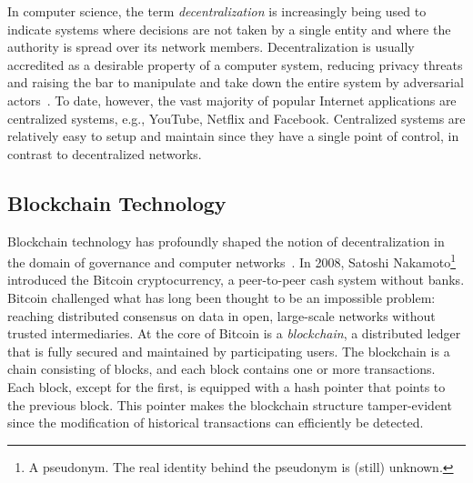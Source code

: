 In computer science, the term \emph{decentralization} is increasingly being used to indicate systems where decisions are not taken by a single entity and where the authority is spread over its network members.
Decentralization is usually accredited as a desirable property of a computer system, reducing privacy threats and raising the bar to manipulate and take down the entire system by adversarial actors~\cite{troncoso2017systematizing}.
To date, however, the vast majority of popular Internet applications are centralized systems, e.g., YouTube, Netflix and Facebook.
Centralized systems are relatively easy to setup and maintain since they have a single point of control, in contrast to decentralized networks.

\subsection{Blockchain Technology}
Blockchain technology has profoundly shaped the notion of decentralization in the domain of governance and computer networks~\cite{aste2017blockchain}.
In 2008, Satoshi Nakamoto\footnote{A pseudonym. The real identity behind the pseudonym is (still) unknown.} introduced the Bitcoin cryptocurrency, a peer-to-peer cash system without banks.
Bitcoin challenged what has long been thought to be an impossible problem: reaching distributed consensus on data in open, large-scale networks without trusted intermediaries.
At the core of Bitcoin is a \emph{blockchain}, a distributed ledger that is fully secured and maintained by participating users.
The blockchain is a chain consisting of blocks, and each block contains one or more transactions.
Each block, except for the first, is equipped with a hash pointer that points to the previous block.
This pointer makes the blockchain structure tamper-evident since the modification of historical transactions can efficiently be detected.

